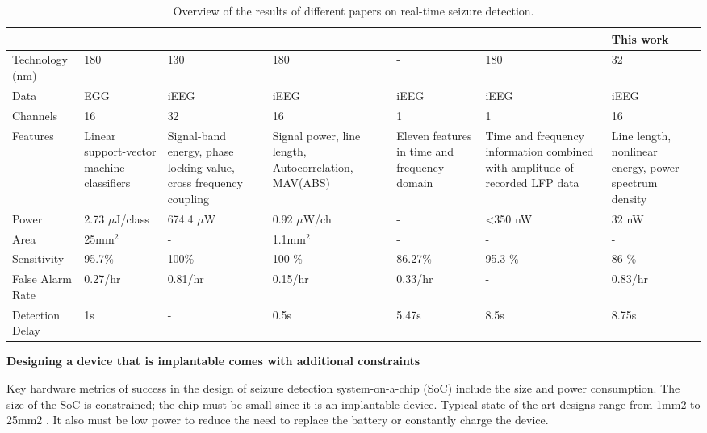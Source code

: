 \documentclass[usletter, 11pt]{extarticle}
\begin{document}
\begin{table}[h!]
	\centering
  	\begin{tabularx}{\textwidth}{|X|X|X|X|X|X|X|}
  		\hline
	    & \cite{altaf2015} & \cite{oleary2018} & \cite{shoaran2016} & \cite{donos2015} & \cite{raghunathan2009} & \textbf{This work} \\ \hline
	    Technology (nm) & 180 & 130 & 180 & - & 180 & 32 \\ \hline
	    Data & EGG & iEEG & iEEG & iEEG & iEEG & iEEG \\ \hline
	    Channels & 16 & 32 & 16 & 1 & 1 & 16 \\ \hline
	    Features & Linear support-vector machine  classifiers & Signal-band energy, phase locking value, cross frequency coupling & Signal power, line length, Autocorrelation, MAV(ABS) & Eleven features in time and frequency domain & Time and frequency information combined with amplitude of recorded LFP data & Line length, nonlinear energy, power spectrum density \\ \hline
	    Power & 2.73 $\mu$J/class & 674.4 $\mu$W & 0.92 $\mu$W/ch & - & <350 nW & 32 nW\\ \hline
	    Area & 25mm$^2$ & - & 1.1mm$^2$ & - & - & - \\ \hline
	    Sensitivity & 95.7\% & 100\% & 100 \% & 86.27\% & 95.3 \% & 86 \% \\ \hline
	    False Alarm Rate & 0.27/hr & 0.81/hr & 0.15/hr & 0.33/hr & - & 0.83/hr\\ \hline
	    Detection Delay & 1s & - & 0.5s & 5.47s & 8.5s & 8.75s \\ \hline
  	\end{tabularx}
  	\caption{Overview of the results of different papers on real-time seizure detection.}
  	\label{tab:overview}
\end{table}

\vspace{11pt}
\textbf{Designing a device that is implantable comes with additional constraints}

Key hardware metrics of success in the design of seizure detection system-on-a-chip (SoC) include the size and power consumption. The size of the SoC is constrained; the chip must be small since it is an implantable device. Typical state-of-the-art designs range from 1mm2 to 25mm2 \cite{shoaran2016}. It also must be low power to reduce the need to replace the battery or constantly charge the device.
\end{document}
